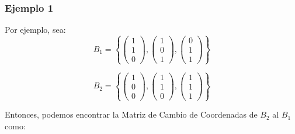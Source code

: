 \documentclass[12pt]{report}							    %
\begin{document}
        \subsubsection{Ejemplo 1}

        Por ejemplo, sea:
        \begin{equation*}
            B_1 = \left\{
                \begin{pmatrix} 1 \\ 1 \\0 \end{pmatrix}, \begin{pmatrix} 1 \\ 0 \\1 \end{pmatrix},
                \begin{pmatrix} 0 \\ 1 \\1 \end{pmatrix}
            \right\}
        \end{equation*}

        \begin{equation*}
            B_2 = \left\{
                \begin{pmatrix} 1 \\ 0 \\0 \end{pmatrix}, \begin{pmatrix} 1 \\ 1 \\0 \end{pmatrix},
                \begin{pmatrix} 1 \\ 1 \\1 \end{pmatrix}
            \right\}
        \end{equation*}

        Entonces, podemos encontrar la Matriz de Cambio de Coordenadas de $B_2$ al $B_1$ como:
\end{document}
